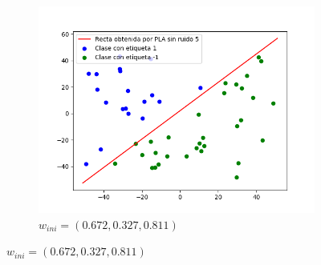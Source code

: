 \documentclass[12pt,a4paper]{article}
\begin{document}
\begin{figure}[H]
\begin{subfigure}{0.33\textwidth}
		\includegraphics[scale=0.37]{./Imagenes/ej2-7.png}
		\caption{$w_{ini} = (0.672,0.327,0.811)$}
	\end{subfigure}
\end{figure}
\end{document}
